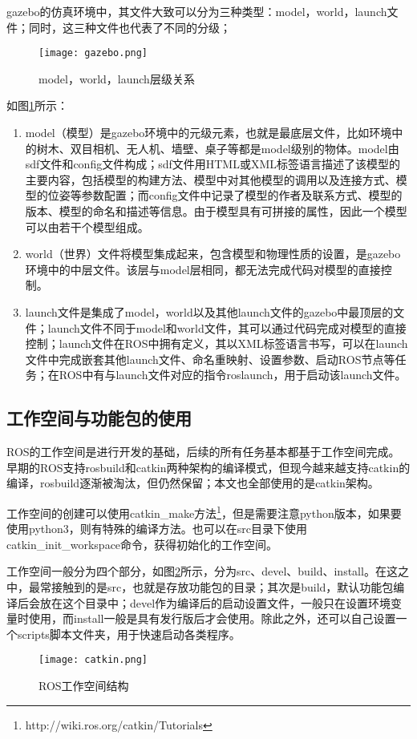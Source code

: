 gazebo的仿真环境中，其文件大致可以分为三种类型：model，world，launch文件；同时，这三种文件也代表了不同的分级；

\begin{figure}[!ht]
	\centering
	\texttt{[image: gazebo.png]}
	\caption{model，world，launch层级关系} 
	\label{fig3}
\end{figure}

如图\ref{fig3}所示：
\begin{enumerate}
	\item model（模型）是gazebo环境中的元级元素，也就是最底层文件，比如环境中的树木、双目相机、无人机、墙壁、桌子等都是model级别的物体。model由sdf文件和config文件构成；sdf文件用HTML或XML标签语言描述了该模型的主要内容，包括模型的构建方法、模型中对其他模型的调用以及连接方式、模型的位姿等参数配置；而config文件中记录了模型的作者及联系方式、模型的版本、模型的命名和描述等信息。由于模型具有可拼接的属性，因此一个模型可以由若干个模型组成。
	\item
	world（世界）文件将模型集成起来，包含模型和物理性质的设置，是gazebo环境中的中层文件。该层与model层相同，都无法完成代码对模型的直接控制。
	\item 
	launch文件是集成了model，world以及其他launch文件的gazebo中最顶层的文件；launch文件不同于model和world文件，其可以通过代码完成对模型的直接控制；launch文件在ROS中拥有定义，其以XML标签语言书写，可以在launch文件中完成嵌套其他launch文件、命名重映射、设置参数、启动ROS节点等任务；在ROS中有与launch文件对应的指令roslaunch，用于启动该launch文件。
\end{enumerate}


\subsection{工作空间与功能包的使用}

ROS的工作空间是进行开发的基础，后续的所有任务基本都基于工作空间完成。早期的ROS支持rosbuild和catkin两种架构的编译模式，但现今越来越支持catkin的编译，rosbuild逐渐被淘汰，但仍然保留；本文也全部使用的是catkin架构。

工作空间的创建可以使用catkin\_make方法\footnote[1]{http://wiki.ros.org/catkin/Tutorials}，但是需要注意python版本，如果要使用python3，则有特殊的编译方法。也可以在src目录下使用catkin\_init\_workspace命令，获得初始化的工作空间。

工作空间一般分为四个部分，如图\ref{fig-catkin}所示，分为src、devel、build、install。在这之中，最常接触到的是src，也就是存放功能包的目录；其次是build，默认功能包编译后会放在这个目录中；devel作为编译后的启动设置文件，一般只在设置环境变量时使用，而install一般是具有发行版后才会使用。除此之外，还可以自己设置一个scripts脚本文件夹，用于快速启动各类程序。
~\\
\begin{figure}[!ht]
	\centering
	\texttt{[image: catkin.png]}
	\caption{ROS工作空间结构} 
	\label{fig-catkin}
\end{figure}

